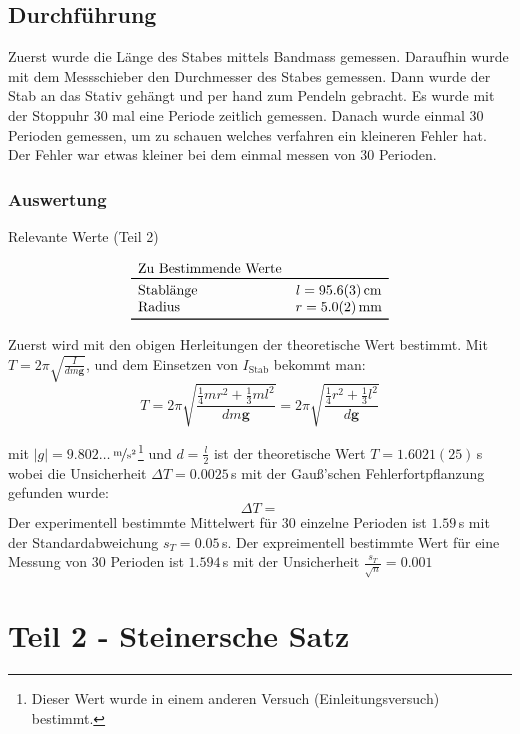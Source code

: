 \documentclass[11pt,a4paper]{article}
\renewcommand{\vec}{\boldsymbol}
\begin{document}
\FloatBarrier
\subsection{Durchführung}

Zuerst wurde die Länge des Stabes mittels Bandmass gemessen. Daraufhin wurde mit dem Messschieber den Durchmesser des Stabes gemessen. Dann wurde der Stab an das Stativ gehängt und per hand zum Pendeln gebracht. Es wurde mit der Stoppuhr 30 mal eine Periode zeitlich gemessen. Danach wurde einmal 30 Perioden gemessen, um zu schauen welches verfahren ein kleineren Fehler hat. Der Fehler war etwas kleiner bei dem einmal messen von 30 Perioden.

\subsubsection{Auswertung}

\begin{table}[ht]
\caption{Relevante Werte (Teil 2)}
$$
\begin{array}{lc}
	\multicolumn{1}{l}{\textrm{Zu Bestimmende Werte}} \\
	\toprule 
	\textrm{Stablänge} & l = 95.6(3)\,\textrm{cm} \\
	\textrm{Radius} & r = 5.0(2)\,\textrm{mm} \\
	\bottomrule 
\end{array}
$$
\end{table}

Zuerst wird mit den obigen Herleitungen der theoretische Wert bestimmt. Mit $T = 2\pi \sqrt{\frac{I}{dm\vec{g}}}$, und dem Einsetzen von $I_{\textrm{Stab}}$ bekommt man:
$$T = 2\pi \sqrt{\frac{\frac{1}{4} m r^2 + \frac{1}{3} m l^2}{dm\vec{g}}} = 2\pi \sqrt{\frac{\frac{1}{4} r^2 + \frac{1}{3} l^2}{d\vec{g}}}$$

mit $|g|=9.802\dots$\,$\nicefrac{\textrm{m}}{\textrm{s}^2}$\footnote{Dieser Wert wurde in einem anderen Versuch (Einleitungsversuch) bestimmt.} und $d = \frac{l}{2}$ ist der theoretische Wert $T = 1.6021(25)$\,s wobei die Unsicherheit $\Delta T = 0.0025$\,s mit der Gauß'schen Fehlerfortpflanzung gefunden wurde:
$$\Delta T = $$
Der experimentell bestimmte Mittelwert für 30 einzelne Perioden ist $1.59$\,s mit der Standardabweichung $s_T = 0.05$\,s.
Der expreimentell bestimmte Wert für eine Messung von 30 Perioden ist $1.594\,$s mit der Unsicherheit $\frac{s_T}{\sqrt{n}} = 0.001$ 

\pagebreak

\section{Teil 2 - Steinersche Satz}
\end{document}
